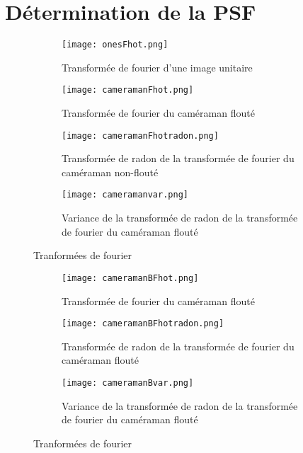 \documentclass{article}
\begin{document}
\section{Détermination de la PSF}
\begin{figure}[!ht]
  \centering
  \begin{subfigure}[b]{0.45\textwidth}
    \texttt{[image: onesFhot.png]}
    \caption{Transformée de fourier d'une image unitaire}
    \label{fig:onesFhot}
  \end{subfigure}
  \begin{subfigure}[b]{0.35\textwidth}
    \texttt{[image: cameramanFhot.png]}
    \caption{Transformée de fourier du caméraman flouté}
    \label{fig:cameramanFhot}
  \end{subfigure}%
  \begin{subfigure}[b]{0.2\textwidth}
    \texttt{[image: cameramanFhotradon.png]}
    \caption{Transformée de radon de la transformée de fourier du caméraman non-flouté}
    \label{fig:cameramanFhotradon}
  \end{subfigure}%
  \begin{subfigure}[b]{0.4\textwidth}
    \texttt{[image: cameramanvar.png]}
    \caption{Variance de la transformée de radon de la transformée de fourier du caméraman flouté}
    \label{fig:cameramanvar}
  \end{subfigure}
  \caption{Tranformées de fourier}
  \label{fig:fourier}
  \begin{subfigure}[b]{0.35\textwidth}
    \texttt{[image: cameramanBFhot.png]}
    \caption{Transformée de fourier du caméraman flouté}
    \label{fig:cameramanBFhot}
  \end{subfigure}%
  \begin{subfigure}[b]{0.2\textwidth}
    \texttt{[image: cameramanBFhotradon.png]}
    \caption{Transformée de radon de la transformée de fourier du caméraman flouté}
    \label{fig:cameramanBFhotradon}
  \end{subfigure}%
  \begin{subfigure}[b]{0.4\textwidth}
    \texttt{[image: cameramanBvar.png]}
    \caption{Variance de la transformée de radon de la transformée de fourier du caméraman flouté}
    \label{fig:cameramanBvar}
  \end{subfigure}
  \caption{Tranformées de fourier}
  \label{fig:fourier}
\end{figure}
\end{document}
